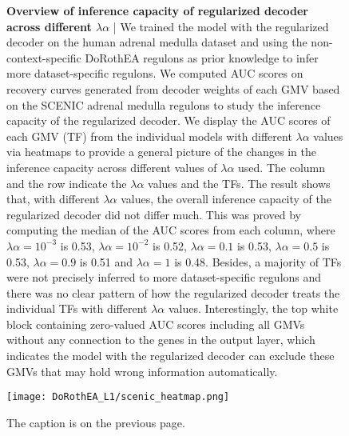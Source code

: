 \begin{figure}[b!]
    \vspace{4cm}
    \caption{\small{\textbf{Overview of inference capacity of regularized decoder across different $\lambda\alpha$} | We trained the model with the regularized decoder on the human adrenal medulla dataset and using the non-context-specific DoRothEA regulons as prior knowledge to infer more dataset-specific regulons. We computed AUC scores on recovery curves generated from decoder weights of each GMV based on the SCENIC adrenal medulla regulons to study the inference capacity of the regularized decoder. We display the AUC scores of each GMV (TF) from the individual models with different $\lambda\alpha$ values via heatmaps to provide a general picture of the changes in the inference capacity across different values of $\lambda\alpha$ used. The column and the row indicate the $\lambda\alpha$ values and the TFs. The result shows that, with different $\lambda\alpha$ values, the overall inference capacity of the regularized decoder did not differ much. This was proved by computing the median of the AUC scores from each column, where $\lambda\alpha = 10^{-3}$ is 0.53, $\lambda\alpha = 10^{-2}$ is 0.52, $\lambda\alpha = 0.1$ is 0.53, $\lambda\alpha = 0.5$ is 0.53, $\lambda\alpha = 0.9$ is 0.51 and $\lambda\alpha = 1$ is 0.48. Besides, a majority of TFs were not precisely inferred to more dataset-specific regulons and there was no clear pattern of how the regularized decoder treats the individual TFs with different $\lambda\alpha$ values. Interestingly, the top white block containing zero-valued AUC scores including all GMVs without any connection to the genes in the output layer, which indicates the model with the regularized decoder can exclude these GMVs that may hold wrong information automatically.}}
\end{figure}

\addtocounter{figure}{-1}
\begin{figure}[h!]
    \centering
    \hspace*{-6mm}
    \texttt{[image: DoRothEA\_L1/scenic\_heatmap.png]}
    \caption{\small{The caption is on the previous page.}}
    \label{fig:L1_dorothea_scenic_heatmap}
\end{figure}

